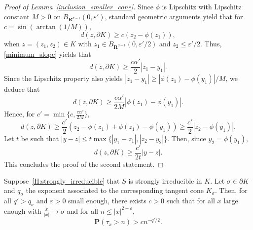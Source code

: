 \documentclass[10pt]{amsart}
\theoremstyle{definition}\newtheorem{defi}[theo]{Definition}\newtheorem{rema}[theo]{Remark}\newtheorem{exam}[theo]{Example}\newtheorem{exem}[theo]{Example}\newtheorem{nota}[theo]{Notation}
\newcommand{\pr}{\mathbf{P}}
\newcommand{\bfR}{\mathbf{R}}
\renewcommand{\epsilon}{\varepsilon}
\renewcommand{\leq}{\leqslant}
\renewcommand{\geq}{\geqslant}
\begin{document}
\begin{proof}[Proof of Lemma~\ref{inclusion_smaller_cone}]
Since $\phi$ is Lipschitz with Lipschitz constant $M>0$ on $B_{\bfR^{d-1}}(0,\epsilon')$, standard geometric arguments yield that for $c=\sin(\arctan(1/M))$,
\[
d(z,\partial K)\geq c\left(z_{2}-\phi(z_{1})\right),
\]
when $z=(z_{1},z_{2})\in K$ with $z_{1}\in B_{\bfR^{d-1}}(0,\epsilon'/2)$ and $z_{2}\leq \epsilon'/2$. Thus, \eqref{minimum_slope} yields that
\begin{equation}\label{first_coordinate}
d(z,\partial K)\geq \frac{c\alpha'}{2} |z_{1}-y_{1}|.
\end{equation}
Since the Lipschitz property also yields $| z_{1}-y_{1}|\geq |\phi(z_{1})-\phi(y_{1})|/M$, we deduce that
\[
d(z,\partial K)\geq \frac{c\alpha'}{2M}| \phi(z_{1})-\phi(y_{1})|.
\]
Hence, for $c'=\min\{c,\tfrac{c\alpha'}{2M}\}$,
\begin{equation}\label{second_coordinate}
d(z,\partial K)\geq \frac{c'}{2}\left(z_{2}-\phi(z_{1})+\phi(z_{1})-\phi(y_{1})\right)\geq \frac{c'}{2}|z_{2}-\phi(y_{1})|.
\end{equation}
Let $t$ be such that $|y-z| \leq t\max\{| y_{1}-z_{1}|,| z_{2}-y_{2}|\}$. Then, since $y_{2}=\phi(y_{1})$,
\[
d(z,\partial K)\geq \frac{c'}{2t}| y-z|.
\]
This concludes the proof of the second statement.
\end{proof}

\begin{prop}\label{lower_bound_survival_tangent}
Suppose~\eqref{H:strongly_irreducible} that $S$ is strongly irreducible in $K$. Let $\sigma\in\partial K$ and $q_{\sigma}$ the exponent associated to the corresponding tangent cone $K_{\sigma}$. Then, for all $q'>q_{\sigma}$ and $\epsilon>0$ small enough, there exists $c>0$ such that for all $x$ large enough with $\frac{x}{| x|} \rightarrow \sigma$ and for all $n\leq |x|^{2-\epsilon}$,
\[
\pr(\tau_{x}>n)>cn^{-q'/2}.
\]
\end{prop}
\end{document}
